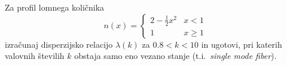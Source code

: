 \begin{enumerate}
    Za profil lomnega količnika
    \begin{equation*}
      n(x)=\begin{cases}2-\frac12x^2 & x<1\\ 1 & x\geq 1\end{cases}
    \end{equation*}
    izračunaj disperzijsko relacijo $\lambda(k)$ za $0.8<k<10$ in ugotovi,
    pri katerih valovnih številih $k$ obstaja samo eno vezano stanje
    (t.i.~\emph{single mode fiber}).

    \end{enumerate}